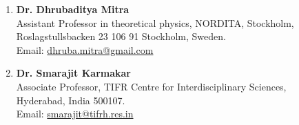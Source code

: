 \documentclass[margin]{res}
\begin{document}
\begin{resume}
\begin{enumerate}
    \item {\bf Dr. Dhrubaditya Mitra}\\
        Assistant Professor in theoretical physics, NORDITA, Stockholm, \\ Roslagstullsbacken 23 106 91 Stockholm, Sweden. \\
        Email: \href{dhruba.mitra@gmail.com}{dhruba.mitra@gmail.com}
    \item {\bf Dr. Smarajit Karmakar}\\ 
        Associate Professor, TIFR Centre for Interdisciplinary Sciences, \\ Hyderabad, India 500107. \\ 
        Email: \href{smarajit@tifrh.res.in}{smarajit@tifrh.res.in}
\end{enumerate}
   \end{resume} 
\end{document}
